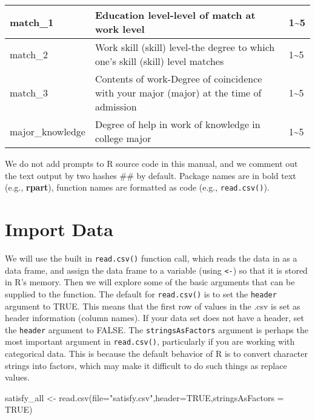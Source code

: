 \documentclass[
]{book}
\newenvironment{Shaded}{\begin{snugshade}}{\end{snugshade}}
\newcommand{\AttributeTok}[1]{\textcolor[rgb]{0.77,0.63,0.00}{#1}}
\newcommand{\ConstantTok}[1]{\textcolor[rgb]{0.00,0.00,0.00}{#1}}
\newcommand{\FunctionTok}[1]{\textcolor[rgb]{0.00,0.00,0.00}{#1}}
\newcommand{\NormalTok}[1]{#1}
\newcommand{\OtherTok}[1]{\textcolor[rgb]{0.56,0.35,0.01}{#1}}
\newcommand{\StringTok}[1]{\textcolor[rgb]{0.31,0.60,0.02}{#1}}
\begin{document}
\begin{tabular}{l|l|l}
\hline
match\_1 & Education level-level of match at work level & 1\textasciitilde{}5\\
\hline
match\_2 & Work skill (skill) level-the degree to which one's skill (skill) level matches & 1\textasciitilde{}5\\
\hline
match\_3 & Contents of work-Degree of coincidence with your major (major) at the time of admission & 1\textasciitilde{}5\\
\hline
major\_knowledge & Degree of help in work of knowledge in college major & 1\textasciitilde{}5\\
\hline
\end{tabular}

We do not add prompts to R source code in this manual, and we comment out the text output by two hashes \#\#
by default.
Package names are in bold text (e.g., \textbf{rpart}), function names are formatted as code (e.g., \texttt{read.csv()}).

\hypertarget{import-data-1}{%
\section{Import Data}\label{import-data-1}}

We will use the built in \texttt{read.csv()} function call, which reads the data in as a data frame, and assign the data frame to a variable (using \texttt{\textless{}-}) so that it is stored in R's memory. Then we will explore some of the basic arguments that can be supplied to the function. The default for \texttt{read.csv()} is to set the \texttt{header} argument to TRUE. This means that the first row of values in the .csv is set as header information (column names). If your data set does not have a header, set the \texttt{header} argument to FALSE. The \texttt{stringsAsFactors} argument is perhaps the most important argument in \texttt{read.csv()}, particularly if you are working with categorical data. This is because the default behavior of R is to convert character strings into factors, which may make it difficult to do such things as replace values.

\begin{Shaded}
\begin{Highlighting}[]
\NormalTok{satisfy\_all }\OtherTok{\textless{}{-}} \FunctionTok{read.csv}\NormalTok{(}\AttributeTok{file=}\StringTok{"satisfy.csv"}\NormalTok{,}\AttributeTok{header=}\ConstantTok{TRUE}\NormalTok{,}\AttributeTok{stringsAsFactors =} \ConstantTok{TRUE}\NormalTok{)}
\end{Highlighting}
\end{Shaded}
\end{document}
